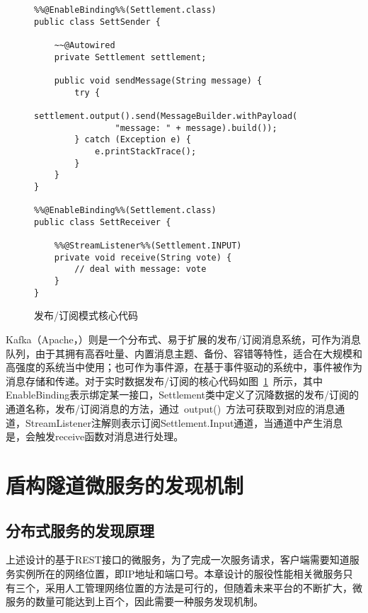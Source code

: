 \begin{figure}[htb!]
\centering
\begin{minipage}[t]{1.0\linewidth}
\begin{lstlisting}
%%@EnableBinding%%(Settlement.class)  
public class SettSender {  
      
    ~~@Autowired  
    private Settlement settlement;  
      
    public void sendMessage(String message) {  
	    try {  
	        settlement.output().send(MessageBuilder.withPayload(
	        	"message: " + message).build());  
	    } catch (Exception e) {  
	        e.printStackTrace();  
	    }  
    }  
}

%%@EnableBinding%%(Settlement.class)  
public class SettReceiver {  
  
    %%@StreamListener%%(Settlement.INPUT)  
    private void receive(String vote) {  
        // deal with message: vote
    }     
}  
\end{lstlisting}
\end{minipage} 
\caption{发布/订阅模式核心代码}
\label{fig:发布订阅模式核心代码}
\end{figure}

Kafka（Apache，\citeyear{kafka2017}）则是一个分布式、易于扩展的发布/订阅消息系统，可作为消息队列，由于其拥有高吞吐量、内置消息主题、备份、容错等特性，适合在大规模和高强度的系统当中使用；也可作为事件源，在基于事件驱动的系统中，事件被作为消息存储和传递。对于实时数据发布/订阅的核心代码如图~\ref{fig:发布订阅模式核心代码}~所示，其中EnableBinding表示绑定某一接口，Settlement类中定义了沉降数据的发布/订阅的通道名称，发布/订阅消息的方法，通过~output()~方法可获取到对应的消息通道，StreamListener注解则表示订阅Settlement.Input通道，当通道中产生消息是，会触发receive函数对消息进行处理。

\section{盾构隧道微服务的发现机制}
\label{chap:service-discovery}

\subsection{分布式服务的发现原理}
上述设计的基于REST接口的微服务，为了完成一次服务请求，客户端需要知道服务实例所在的网络位置，即IP地址和端口号。本章设计的服役性能相关微服务只有三个，采用人工管理网络位置的方法是可行的，但随着未来平台的不断扩大，微服务的数量可能达到上百个，因此需要一种服务发现机制。

